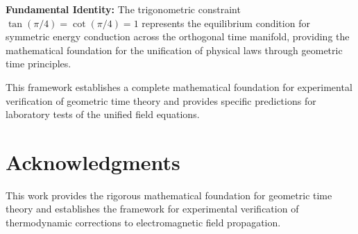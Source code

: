 ﻿\documentclass[12pt]{article}
\begin{document}
\textbf{Fundamental Identity:} The trigonometric constraint $\tan(\pi/4) = \cot(\pi/4) = 1$ represents the equilibrium condition for symmetric energy conduction across the orthogonal time manifold, providing the mathematical foundation for the unification of physical laws through geometric time principles.

This framework establishes a complete mathematical foundation for experimental verification of geometric time theory and provides specific predictions for laboratory tests of the unified field equations.

\section*{Acknowledgments}
This work provides the rigorous mathematical foundation for geometric time theory and establishes the framework for experimental verification of thermodynamic corrections to electromagnetic field propagation.


\end{document}
